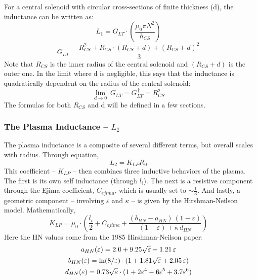 For a central solenoid with circular cross-sections of finite thickness (d), the inductance can be written as: \cite{hartmann}
\begin{equation}
	L_1 = G_{LT} \cdot \left( \frac{\mu_0 \pi N^2}{h_{CS}} \right)
\end{equation}
\begin{equation}
	G_{LT} = \frac{R_{CS}^2 + R_{CS} \cdot ( R_{CS} + d ) + ( R_{CS} + d ) ^ 2 }{3}
\end{equation}
Note that $R_{CS}$ is the inner radius of the central solenoid and $( R_{CS} + d )$ is the outer one. In the limit where d is negligible, this says that the inductance is quadratically dependent on the radius of the central solenoid:
\begin{equation}
	\label{eq:glt_simple}
	\underset{d \to 0}{\lim} \ G_{LT} = G_{LT}^{\,\dagger} = R_{CS}^2
\end{equation}
The formulas for both $R_{CS}$ and d will be defined in a few sections.

\subsubsection{The Plasma Inductance -- $L_2$}

The plasma inductance is a composite of several different terms, but overall scales with radius. Through equation,
\begin{equation}
	L_2 = K_{LP} R_0
\end{equation}
This  coefficient -- $K_{LP}$ -- then combines three inductive behaviors of the plasma. The first is its own self inductance (through $l_i$). \cite{jeff} The next is a resistive component through the Ejima coefficient, $C_{ejima}$, which is usually set to $\sim \frac{1}{3}$. \cite{process} And lastly, a geometric component -- involving $\varepsilon$ and $\kappa$ -- is given by the Hirshman-Neilson model. \cite{hn85} Mathematically,
\begin{equation}
	K_{LP} = \mu_0 \cdot \left( \frac{l_i}{2} + C_{ejima} + \frac{ ( b_{HN} - a_{HN} ) \, ( 1 - \varepsilon ) }{ ( 1 - \varepsilon ) + \kappa \, d_{HN} } \right)
\end{equation}
Here the HN values come from the 1985 Hirshman-Neilson paper:
\begin{gather}
	a_{HN}(\varepsilon) = 2.0 + 9.25 \sqrt{\varepsilon} - 1.21 \, \varepsilon \\
	b_{HN}(\varepsilon) = \textnormal{ln} (8/\varepsilon) \cdot ( 1 + 1.81 \sqrt{\varepsilon} + 2.05 \, \varepsilon ) \\
	d_{HN}(\varepsilon) = 0.73 \sqrt{\varepsilon}  \cdot ( 1 + 2 \varepsilon^4 - 6 \varepsilon^5 +3.7 \varepsilon^6 )
\end{gather}

